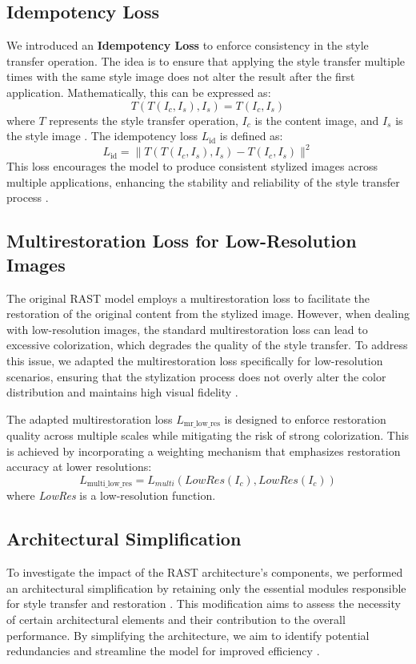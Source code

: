 \documentclass{article}
\begin{document}
\subsection{Idempotency Loss}
We introduced an \textbf{Idempotency Loss} to enforce consistency in the style transfer operation. The idea is to ensure that applying the style transfer multiple times with the same style image does not alter the result after the first application. Mathematically, this can be expressed as:
\[
T(T(I_c, I_s), I_s) = T(I_c, I_s)
\]
where \( T \) represents the style transfer operation, \( I_c \) is the content image, and \( I_s \) is the style image \cite{SomeOtherPaper}. The idempotency loss \( L_{\text{id}} \) is defined as:
\[
L_{\text{id}} = \| T(T(I_c, I_s), I_s) - T(I_c, I_s) \|^2
\]
This loss encourages the model to produce consistent stylized images across multiple applications, enhancing the stability and reliability of the style transfer process \cite{SomeOtherPaper}.

\subsection{Multirestoration Loss for Low-Resolution Images}
The original RAST model employs a multirestoration loss to facilitate the restoration of the original content from the stylized image. However, when dealing with low-resolution images, the standard multirestoration loss can lead to excessive colorization, which degrades the quality of the style transfer. To address this issue, we adapted the multirestoration loss specifically for low-resolution scenarios, ensuring that the stylization process does not overly alter the color distribution and maintains high visual fidelity \cite{Li2018}.

The adapted multirestoration loss \( L_{\text{mr\_low\_res}} \) is designed to enforce restoration quality across multiple scales while mitigating the risk of strong colorization. This is achieved by incorporating a weighting mechanism that emphasizes restoration accuracy at lower resolutions:
\[
L_{\text{multi\_low\_res}} = L_{multi}(\textit{LowRes}(I_c), \textit{LowRes}(I_c))
\]
where \textit{LowRes} is a low-resolution function.

\subsection{Architectural Simplification}
To investigate the impact of the RAST architecture's components, we performed an architectural simplification by retaining only the essential modules responsible for style transfer and restoration \cite{Vazquez2018}. This modification aims to assess the necessity of certain architectural elements and their contribution to the overall performance. By simplifying the architecture, we aim to identify potential redundancies and streamline the model for improved efficiency \cite{Fernandez2019}.
\end{document}
